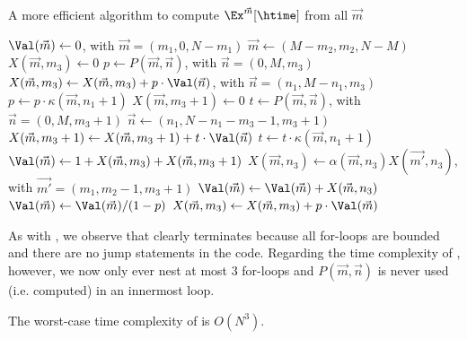 \begin{algorithm}[t]
    \caption{A more efficient algorithm to compute $\Ex^{\vec{m}}[\htime]$ from all $\vec{m}$}
    \label{alg:efficient}
    \begin{algorithmic}[1]
            \State $\Val(\vec{m}) \gets 0$, with $\vec{m} = (m_1,0,N-m_1)$
        \EndFor
         \label{loc:choosem-start}
             
                \State $\vec{m} \gets (M - m_2,m_2,N-M)$
                \State $X(\vec{m},m_3) \gets 0$ \label{loc:mm3-start} 
                \State $p \gets P(\vec{m},\vec{n})$, with $\vec{n} = (0,M,m_3)$
                    \State $X(\vec{m},m_3) \gets X(\vec{m},m_3) + p \cdot \Val(\vec{n})$, with $\vec{n} = (n_1,M-n_1,m_3)$
                    \State $p \gets p \cdot \kappa(\vec{m},n_1+1)$
                \EndFor \label{loc:mm3-end}
                \State $X(\vec{m},m_3+1) \gets 0$ \label{loc:mm31-start} 
                \State $t \gets P(\vec{m},\vec{n})$, with $\vec{n} = (0,M,m_3 + 1)$
                    \State $\vec{n} \gets (n_1,N-n_1-m_3-1,m_3+1)$
                    \State $X(\vec{m},m_3+1) \gets X(\vec{m},m_3+1) + t \cdot \Val(\vec{n})$
                    \State $t \gets t \cdot \kappa(\vec{m},n_1 + 1)$
                \EndFor \label{loc:mm31-end}
                \State  $\Val(\vec{m}) \gets 1 + X(\vec{m},m_3) + X(\vec{m},m_3+1)$ \label{loc:val-start} 
                    \State $X(\vec{m},n_3) \gets \alpha(\vec{m},n_3) X(\vec{m'},n_3)$, with $\vec{m'} = (m_1,m_2-1,m_3+1)$
                    \State $\Val(\vec{m}) \gets \Val(\vec{m}) + X(\vec{m},n_3)$
                \EndFor
                \State $\Val(\vec{m}) \gets \Val(\vec{m}) / (1-p)$ \label{loc:val-end}
                \State $X(\vec{m},m_3) \gets X(\vec{m},m_3) + p \cdot \Val(\vec{m})$ \label{loc:fixmm3}
            \EndFor
        \EndFor \label{loc:choosem-end}
    \end{algorithmic}
\end{algorithm}


As with , we observe that  clearly terminates because all for-loops are bounded and there are no jump statements in the code. Regarding the time complexity of , however, we now only ever nest at most $3$ for-loops and $P(\vec{m},\vec{n})$ is never used (i.e. computed) in an innermost loop.
\begin{theorem}[Complexity]
    The worst-case time complexity of  is $O(N^3)$.
\end{theorem}

